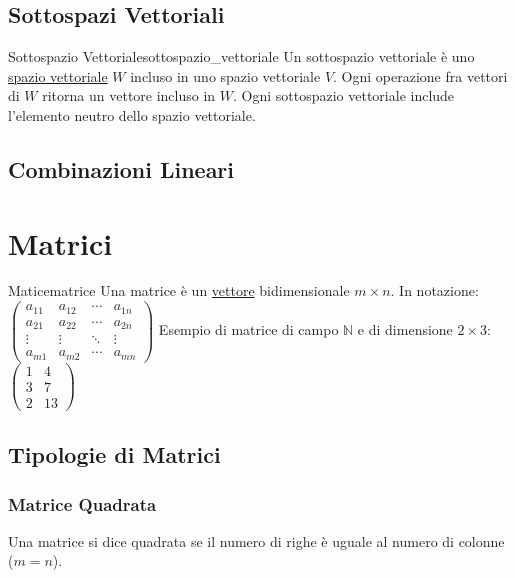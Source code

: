 \documentclass{article}
\begin{document}
\subsection{Sottospazi Vettoriali}

\begin{definition}{Sottospazio Vettoriale}{sottospazio_vettoriale}
    Un sottospazio vettoriale è uno \hyperlink{def:spazio_vettoriale}{spazio vettoriale} $W$ incluso in uno spazio vettoriale $V$. Ogni operazione fra vettori di $W$ ritorna un vettore incluso in $W$. Ogni sottospazio vettoriale include l'elemento neutro dello spazio vettoriale.
\end{definition}

\subsection{Combinazioni Lineari}

\section{Matrici}

\begin{definition}{Matice}{matrice}
    Una matrice è un \hyperlink{def:vettore}{vettore} bidimensionale $m \times n$. In notazione: $\begin{pmatrix}
    a_{11} & a_{12} & \cdots & a_{1n} \\
    a_{21} & a_{22} & \cdots & a_{2n} \\
    \vdots & \vdots & \ddots & \vdots \\
    a_{m1} & a_{m2} & \cdots & a_{mn}
    \end{pmatrix}$ Esempio di matrice di campo $\mathbb{N}$ e di dimensione $2 \times 3$: $\begin{pmatrix}
    1 & 4 \\
    3 & 7 \\
    2 & 13
    \end{pmatrix}$
\end{definition}

\subsection{Tipologie di Matrici}

\subsubsection*{Matrice Quadrata}
Una matrice si dice quadrata se il numero di righe è uguale al numero di colonne ($m=n$).
\end{document}
